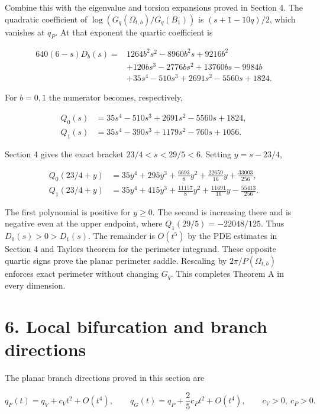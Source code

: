 \documentclass[11pt]{article}
\begin{document}
Combine this with the eigenvalue and torsion expansions proved in
Section 4. The quadratic coefficient of
\(\log(G_q(\Omega_{t,b})/G_q(B_1))\) is \((s+1-10q)/2\), which vanishes
at \(q_P\). At that exponent the quartic coefficient is

\[
\begin{aligned}
640(6-s)D_b(s)={}&1264b^2s^2-8960b^2s+9216b^2\\
&+120bs^3-2776bs^2+13760bs-9984b\\
&+35s^4-510s^3+2691s^2-5560s+1824.
\end{aligned}
\tag{5.2}
\]

For \(b=0,1\) the numerator becomes, respectively,

\[
\begin{aligned}
Q_0(s)&=35s^4-510s^3+2691s^2-5560s+1824,\\
Q_1(s)&=35s^4-390s^3+1179s^2-760s+1056.
\end{aligned}
\tag{5.3}
\]

Section 4 gives the exact bracket \(23/4<s<29/5<6\). Setting
\(y=s-23/4\),

\[
\begin{aligned}
Q_0(23/4+y)&=35y^4+295y^3+\frac{6693}{8}y^2+\frac{22659}{16}y+\frac{33003}{256},\\
Q_1(23/4+y)&=35y^4+415y^3+\frac{11157}{8}y^2+\frac{11691}{16}y-\frac{55413}{256}.
\end{aligned}
\tag{5.4}
\]

The first polynomial is positive for \(y\ge0\). The second is increasing
there and is negative even at the upper endpoint, where
\(Q_1(29/5)=-22048/125\). Thus \(D_0(s)>0>D_1(s)\). The remainder is
\(O(t^5)\) by the PDE estimates in Section 4 and
Taylor\textquotesingle s theorem for the perimeter integrand. These
opposite quartic signs prove the planar perimeter saddle. Rescaling by
\(2\pi/P(\Omega_{t,b})\) enforces exact perimeter without changing
\(G_q\). This completes Theorem A in every dimension.

\section{6. Local bifurcation and branch
directions}\label{local-bifurcation-and-branch-directions}

The planar branch directions proved in this section are

\[
q_F(t)=q_V+c_Vt^2+O(t^4),\qquad
q_G(t)=q_P+\frac25c_Pt^2+O(t^4),
\qquad c_V>0,\ c_P>0.
\tag{6.1}
\]
\end{document}
